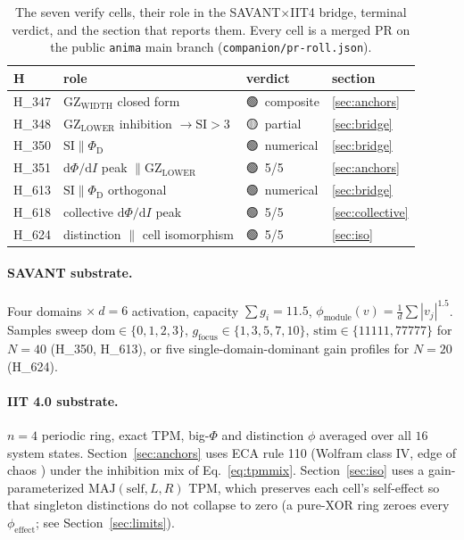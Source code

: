 \documentclass[11pt,a4paper]{article}
\providecommand{\tierGreen}{🟢}
\providecommand{\tierYellow}{🟡}
\newcommand{\GZL}{\mathrm{GZ_{LOWER}}}
\newcommand{\GZW}{\mathrm{GZ_{WIDTH}}}
\newcommand{\Svi}{\mathrm{SI}}
\newcommand{\PhiD}{\Phi_{\mathrm{D}}}
\begin{document}
\begin{table}[h]
\centering
\small
\begin{tabular}{llll}
\toprule
\textbf{H} & \textbf{role} & \textbf{verdict} & \textbf{section} \\
\midrule
H\_347 & $\GZW$ closed form & \tierGreen\ composite & \ref{sec:anchors} \\
H\_348 & $\GZL$ inhibition $\to \Svi>3$ & \tierYellow\ partial & \ref{sec:bridge} \\
H\_350 & $\Svi \parallel \PhiD$ & \tierGreen\ numerical & \ref{sec:bridge} \\
H\_351 & $\mathrm{d}\Phi/\mathrm{d}I$ peak $\parallel \GZL$ & \tierGreen\ 5/5 & \ref{sec:anchors} \\
H\_613 & $\Svi \parallel \PhiD$ orthogonal & \tierGreen\ numerical & \ref{sec:bridge} \\
H\_618 & collective $\mathrm{d}\Phi/\mathrm{d}I$ peak & \tierGreen\ 5/5 & \ref{sec:collective} \\
H\_624 & distinction $\parallel$ cell isomorphism & \tierGreen\ 5/5 & \ref{sec:iso} \\
\bottomrule
\end{tabular}
\caption{The seven verify cells, their role in the SAVANT$\times$IIT4
bridge, terminal verdict, and the section that reports them. Every cell is
a merged PR on the public \texttt{anima} main branch
(\texttt{companion/pr-roll.json}).}
\label{tab:cells}
\end{table}

\paragraph{SAVANT substrate.}
Four domains $\times\ d=6$ activation, capacity $\sum g_i=11.5$,
$\phi_{\mathrm{module}}(v)=\tfrac1d\sum|v_j|^{1.5}$. Samples sweep
$\mathrm{dom}\in\{0,1,2,3\}$, $g_{\mathrm{focus}}\in\{1,3,5,7,10\}$,
$\mathrm{stim}\in\{11111,77777\}$ for $N=40$ (H\_350, H\_613), or five
single-domain-dominant gain profiles for $N=20$ (H\_624).

\paragraph{IIT 4.0 substrate.}
$n=4$ periodic ring, exact TPM, big-$\Phi$ and distinction $\phi$ averaged
over all $16$ system states. Section~\ref{sec:anchors} uses ECA rule 110
(Wolfram class IV, edge of chaos
\citep{wolfram1984universality,langton1990edgeofchaos}) under the inhibition
mix of Eq.~\eqref{eq:tpmmix}. Section~\ref{sec:iso} uses a
gain-parameterized $\mathrm{MAJ}(\text{self},L,R)$ TPM, which preserves
each cell's self-effect so that singleton distinctions do not collapse to
zero (a pure-XOR ring zeroes every $\phi_{\mathrm{effect}}$; see
Section~\ref{sec:limits}).
\end{document}
